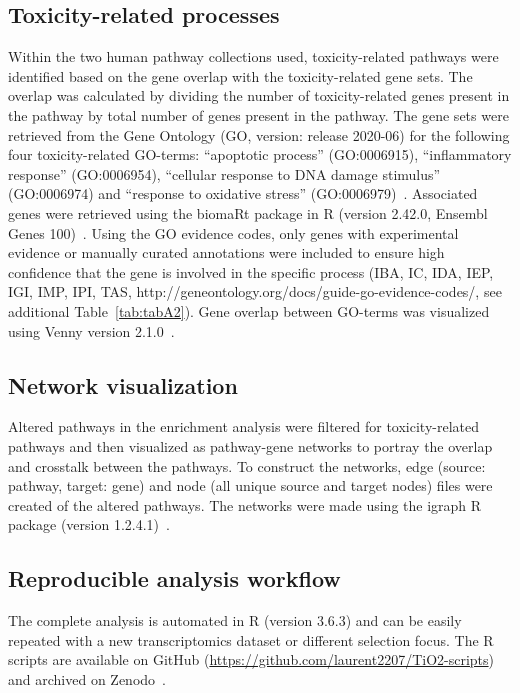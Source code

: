 \documentclass[ijms,article,submit,moreauthors,pdftex]{Definitions/mdpi}
\begin{document}
\subsection*{Toxicity-related processes}
Within the two human pathway collections used, toxicity-related pathways were identified based on the gene overlap with the toxicity-related gene sets. The overlap was calculated by dividing the number of toxicity-related genes present in the pathway by total number of genes present in the pathway. The gene sets were retrieved from the Gene Ontology (GO, version: release 2020-06) for the following four toxicity-related GO-terms: “apoptotic process” (GO:0006915), “inflammatory response” (GO:0006954), “cellular response to DNA damage stimulus” (GO:0006974) and “response to oxidative stress” (GO:0006979)~\cite{Ashburner2000,Carbon2020}. Associated genes were retrieved using the biomaRt package in R (version 2.42.0, Ensembl Genes 100)~\cite{Durinck2005,Durinck2009}. Using the GO evidence codes, only genes with experimental evidence or manually curated annotations were included to ensure high confidence that the gene is involved in the specific process (IBA, IC, IDA, IEP, IGI, IMP, IPI, TAS, http://geneontology.org/docs/guide-go-evidence-codes/, see additional Table~\ref{tab:tabA2}). Gene overlap between GO-terms was visualized using Venny version 2.1.0~\cite{Venny}. 

\subsection*{Network visualization}
Altered pathways in the enrichment analysis were filtered for toxicity-related pathways and then visualized as pathway-gene networks to portray the overlap and crosstalk between the pathways. To construct the networks, edge (source: pathway, target: gene) and node (all unique source and target nodes) files were created of the altered pathways. The networks were made using the igraph R package (version 1.2.4.1)~\cite{Csardi2006}.

\subsection*{Reproducible analysis workflow}
The complete analysis is automated in R (version 3.6.3) and can be easily repeated with a new transcriptomics dataset or different selection focus. The R scripts are available on GitHub (\url{https://github.com/laurent2207/TiO2-scripts}) and archived on Zenodo~\cite{TiO2-scripts}.
\end{document}
